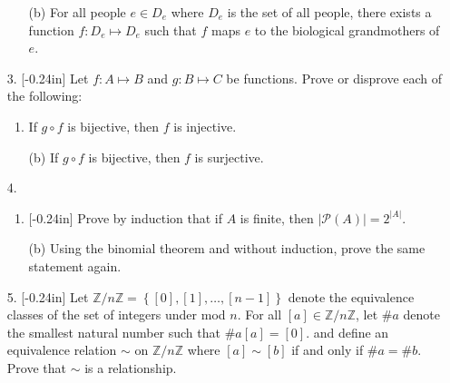 \documentclass[letterpaper,12pt]{article}
\newcommand{\set}[1]{\left\{ #1 \right\}}
\theoremstyle{definition}
\begin{document}
\pagebreak
\begin{enumerate}
    \item[] \begin{enumerate}
        \item[(b)] For all people $e \in D_e$ where $D_e$ is the set of all people, there exists a function $f:D_e \mapsto D_e$ such that $f$ maps $e$ to the biological grandmothers of $e$.
    \end{enumerate}
\end{enumerate}
\pagebreak
\begin{enumerate}
    \item[3. ]\reversemarginpar{}[-0.24in] Let $f: A \mapsto B$ and $g: B \mapsto C$ be functions. Prove or disprove each of the following: \begin{enumerate}
        \item If $g \circ f$ is bijective, then $f$ is injective.
        
    \end{enumerate}
\end{enumerate}
\pagebreak
\begin{enumerate}
    \item[] \begin{enumerate}
        \item[(b)] If $g \circ f$ is bijective, then $f$ is surjective.
    \end{enumerate}
\end{enumerate}
\pagebreak
\begin{enumerate}
    \item[4.]\begin{enumerate}
        \item \reversemarginpar{}[-0.24in] Prove by induction that if $A$ is finite, then $|\mathcal{P}(A)|=2^{|A|}$.
    \end{enumerate}
\end{enumerate}
\pagebreak
\begin{enumerate}
    \item[] \begin{enumerate}
        \item[(b)] Using the binomial theorem and without induction, prove the same statement again.
    \end{enumerate}
\end{enumerate}
\pagebreak
\begin{enumerate}
    \item[5.]  \reversemarginpar{}[-0.24in] Let $\mathbb{Z}/n\mathbb{Z}= \set{[0],[1],\ldots,[n-1]}$ denote the equivalence classes of the set of integers under mod $n$. For all $[a] \in \mathbb{Z}/n\mathbb{Z}$, let $\# a$ denote the smallest natural number such that $\# a[a] = [0]$. and define an equivalence relation $\sim$ on $\mathbb{Z}/n\mathbb{Z}$ where $[a] \sim [b]$ if and only if $\# a = \# b$. Prove that $\sim$ is a relationship.
\end{enumerate}
\end{document}
